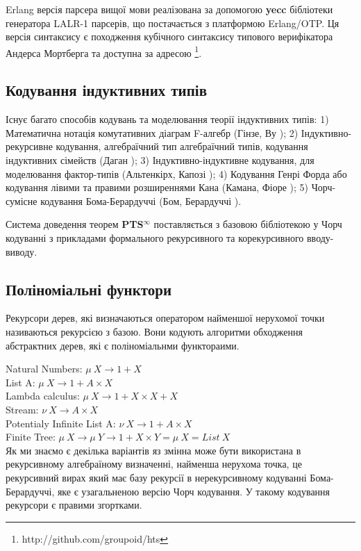 \documentclass{article}
\begin{document}
Erlang версія парсера вищої мови реалізована за допомогою {\bf yecc} бібліотеки генератора LALR-1 парсерів, що постачається з платформою Erlang/OTP.
Ця версія синтаксису є походження кубічного синтаксису типового верифікатора Андерса Мортберга \cite{Mortberg17} 
та доступна за адресою \footnote{http://github.com/groupoid/hts}.

\subsection{Кодування індуктивних типів}
Існує багато способів кодувань та моделювання теорії індуктивних типів:
1) Математична нотація комутативних діаграм F-алгебр (Гінзе, Ву \cite{Hinze13});
2) Індуктивно-рекурсивне кодування, алгебраїчний тип алгебраїчний типів, кодування індуктивних сімейств (Даган \cite{Dagand13});
3) Індуктивно-індуктивне кодування, для моделювання фактор-типів (Альтенкірх, Капозі  \cite{Kaposi16});
4) Кодування Генрі Форда або кодування лівими та правими розширеннями Кана (Камана, Фіоре \cite{Hamana11});
5) Чорч-сумісне кодування Бома-Берардуччі (Бом, Берардуччі \cite{Bohm85}).

Система доведення теорем \textbf{PTS$^\infty$} поставляється з базовою бібліотекою у Чорч кодуванні
з прикладами формального рекурсивного та корекурсивного вводу-виводу.

\subsection{Поліноміальні функтори}
Рекурсори дерев, які визначаються оператором найменшої нерухомої точки називаються рекурсією з базою.
Вони кодують алгоритми обходження абстрактних дерев, які є поліноміальнми функтораими.

\noindent Natural Numbers: $\mu\ X \rightarrow 1 + X$\\
List A: $\mu\ X \rightarrow 1 + A \times X$\\
Lambda calculus: $\mu\ X \rightarrow 1 + X \times X + X$\\
Stream: $\nu\ X \rightarrow A \times X$\\
Potentialy Infinite List A: $\nu\ X \rightarrow 1 + A \times X$\\
Finite Tree: $\mu\ X \rightarrow \mu\ Y \rightarrow 1 + X \times Y = \mu\ X = List\ X$\\

Як ми знаємо є декілька варіантів яз змінна може бути використана в рекурсивному алгебраїному визначенні,
найменша нерухома точка, це рекурсивний вирах який має базу рекурсії в нерекурсивному кодуванні Бома-Берардуччі,
яке є узагальненою версію Чорч кодування. У такому кодування рекурсори є правими згортками.
\end{document}
